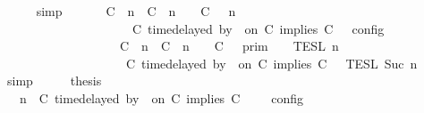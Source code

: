 \begin{isabellebody}
\ \ \ \ \isamarkupfalse%
\ simp\isanewline
\ \ \isamarkupfalse%
\ \isamarkupfalse%
\ {\isacartoucheopen}{\isasymlbrakk}\ {\isacharparenleft}{\isacharparenleft}C\ {\isasymUp}\ n{\isacharparenright}\ {\isacharhash}\ {\isacharparenleft}C\ {\isacharat}\ n\ {\isasymoplus}\ {\isasymdelta}{\isasymtau}\ {\isasymRightarrow}\ C\ {\isacharhash}\ {\isasymGamma}{\isacharparenright}{\isacharcomma}\ n\isanewline
\ \ \ \ \ \ \ \ \ \ \ \ \ \ \ \ \ \ {\isasymturnstile}\ {\isasymPsi}\ {\isasymtriangleright}\ {\isacharparenleft}{\isacharparenleft}C\ time{\isacharminus}delayed\ by\ {\isasymdelta}{\isasymtau}\ on\ C\ implies\ C\ {\isacharhash}\ {\isasymPhi}{\isacharparenright}\ {\isasymrbrakk}\isactrlsub c\isactrlsub o\isactrlsub n\isactrlsub f\isactrlsub i\isactrlsub g\isanewline
\ \ \ \ \ \ \ \ \ \ \ \ \ \ \ \ \ {\isacharequal}\ {\isasymlbrakk}{\isasymlbrakk}\ {\isacharparenleft}C\ {\isasymUp}\ n{\isacharparenright}\ {\isacharhash}\ {\isacharparenleft}C\ {\isacharat}\ n\ {\isasymoplus}\ {\isasymdelta}{\isasymtau}\ {\isasymRightarrow}\ C\ {\isacharhash}\ {\isasymGamma}\ {\isasymrbrakk}{\isasymrbrakk}\isactrlsub p\isactrlsub r\isactrlsub i\isactrlsub m\ {\isasyminter}\ {\isasymlbrakk}{\isasymlbrakk}\ {\isasymPsi}\ {\isasymrbrakk}{\isasymrbrakk}\isactrlsub T\isactrlsub E\isactrlsub S\isactrlsub L\isactrlbsup {\isasymge}\ n\isactrlesup \isanewline
\ \ \ \ \ \ \ \ \ \ \ \ \ \ \ \ \ \ {\isasyminter}\ {\isasymlbrakk}{\isasymlbrakk}\ {\isacharparenleft}C\ time{\isacharminus}delayed\ by\ {\isasymdelta}{\isasymtau}\ on\ C\ implies\ C\ {\isacharhash}\ {\isasymPhi}\ {\isasymrbrakk}{\isasymrbrakk}\isactrlsub T\isactrlsub E\isactrlsub S\isactrlsub L\isactrlbsup {\isasymge}\ Suc\ n\isactrlesup {\isacartoucheclose}\isanewline
\ \ \ \ \isamarkupfalse%
\ simp\isanewline
\ \ \isamarkupfalse%
\ \isamarkupfalse%
\ {\isacharquery}thesis\isanewline
\ \ \isamarkupfalse%
\ {\isacharminus}\isanewline
\ \ \ \ \isamarkupfalse%
\ {\isacartoucheopen}{\isasymlbrakk}\ {\isasymGamma}{\isacharcomma}\ n\ {\isasymturnstile}\ {\isacharparenleft}C\ time{\isacharminus}delayed\ by\ {\isasymdelta}{\isasymtau}\ on\ C\ implies\ C\ {\isacharhash}\ {\isasymPsi}\ {\isasymtriangleright}\ {\isasymPhi}\ {\isasymrbrakk}\isactrlsub c\isactrlsub o\isactrlsub n\isactrlsub f\isactrlsub i\isactrlsub g\isanewline

\end{isabellebody}
